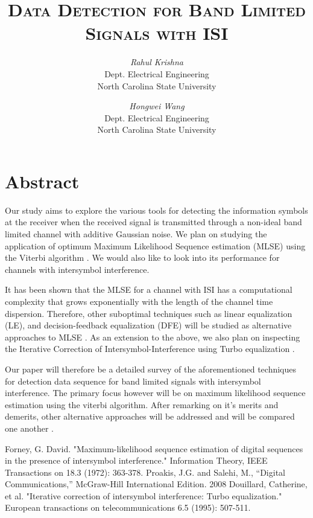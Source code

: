\documentclass[10pt]{article}
\begin{document}
\title{\textsc{Data Detection for Band Limited Signals with ISI}}
\author{\textit{Rahul Krishna}\\Dept. Electrical Engineering\\North Carolina State University \and \textit{Hongwei Wang}\\Dept. Electrical Engineering\\North Carolina State University}
\date{}
\maketitle

\section*{Abstract}
Our study aims to explore the various tools for detecting the information symbols at the receiver when the received signal is transmitted through a non-ideal band limited channel with additive Gaussian noise. We plan on studying the application of optimum Maximum Likelihood Sequence estimation (MLSE) using the Viterbi algorithm \cite{Forney}. We would also like to look into its performance for channels with intersymbol interference.

It has been shown that the MLSE for a channel with ISI has a computational complexity that grows exponentially with the length of the channel time dispersion. Therefore, other suboptimal techniques such as linear equalization (LE), and decision-feedback equalization (DFE) will be studied as alternative approaches to MLSE \cite{Proakis}. As an extension to the above, we also plan on inspecting the Iterative Correction of Intersymbol-Interference using Turbo equalization \cite{Catherine}.

Our paper will therefore be a detailed survey of the aforementioned techniques for detection data sequence for band limited signals with intersymbol interference. The primary focus however will be on maximum likelihood sequence estimation using the viterbi algorithm. After remarking on it's merits and demerits, other alternative approaches will be addressed and will be compared one another \cite{Proakis}.

\begin{thebibliography}{10}
Forney, G. David. "Maximum-likelihood sequence estimation of digital sequences in the presence of intersymbol interference." Information Theory, IEEE Transactions on 18.3 (1972): 363-378.
Proakis, J.G. and Salehi, M., ``Digital Communications,'' McGraw-Hill International Edition. 2008
Douillard, Catherine, et al. "Iterative correction of intersymbol interference: Turbo equalization." European transactions on telecommunications 6.5 (1995): 507-511.
\end{thebibliography}
\end{document}
